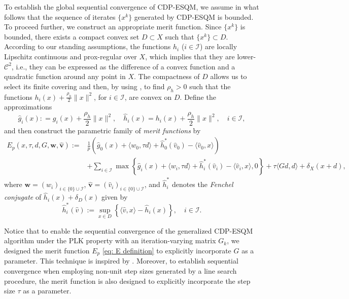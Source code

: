 \documentclass[11pt,a4paper]{article}
\def\hat{\widehat}\def\Hat{\widehat}
\theoremstyle{plain}
\begin{document}
To establish the global sequential convergence of CDP-ESQM, we assume in what follows that the sequence of iterates \( \{x^k\} \) generated by CDP-ESQM is bounded. To proceed further, we construct an appropriate merit function. Since $ \{x^k\} $ is bounded, there exists a compact convex set $D \subset X$ such that $\{x^k\} \subset D$. According to our standing assumptions, {the functions $h_i$ ($i \in \mathcal I$)} are locally Lipschitz continuous and prox-regular over $X$, which implies that {they} are lower-$\mathcal{C}^2$, i.e., they can be expressed as the difference of a convex function and a quadratic function around any point in $X$. The compactness of $D$ allows us to select its finite covering and then, by using \cite[{Theorem~7.102}]{mordukhovich2022convex}, to find $\rho_h > 0$ such that the functions $h_i(x) + \frac{\rho_h}{2}\|x\|^2$, for {$i \in \mathcal I$}, are convex on $D$. Define the approximations
\[
\hat g_i(x): = g_i(x) + \frac{\rho_h}{2}\|x\|^2, \quad \hat{h}_i(x) = h_i(x) + \frac{\rho_h}{2}\|x\|^2, \quad {i \in \mathcal I,}
\]
and then construct the parametric family of {\em merit functions} by
\begin{equation}\label{eq: E definition}  
{
\begin{aligned}
E_{p}(x,\tau,d,G,\mathbf{w},\mathbf{\hat{v}}):=&\frac{1}{p}\left(\hat g_0(x)+\langle w_0,\tau d\rangle+\hat{h}_0^*(\hat v_0)-\langle \hat{v}_0,x\rangle\right)\\
&+\sum_{i\in\mathcal I} \max\left\{\hat g_i(x)+\langle w_i, \tau d\rangle+\hat{h}_i^*(\hat v_i)-\langle \hat{v}_i,x\rangle,0\right\}+\tau\langle Gd,d \rangle+\delta_X(x+d),
\end{aligned}
}
\end{equation}
where {$\mathbf{w} = (w_i)_{i\in\{0\}\cup\mathcal I}$, $\mathbf{\hat{v}} = (\hat{v}_i)_{i\in\{0\}\cup\mathcal I}$}, and $\hat{h}_i^*$ denotes the {\em Fenchel conjugate} of $\hat{h}_i(x) + \delta_D(x)$ given by 
$$
\hat{h}_i^*(\hat v):=\sup_{x \in D} \left\{\langle \hat v,x\rangle-\hat{h}_i(x)\right\}, \quad i \in \mathcal I.
$$

{
Notice that to enable the sequential convergence of the generalized CDP-ESQM algorithm under the PLK property with an iteration-varying matrix $G_k$, we designed the merit function $E_{p}$ \eqref{eq: E definition}
to explicitly incorporate $G$ as a parameter. This technique is inspired by \cite{panshaohua2024proximalnewton}. Moreover, to establish sequential convergence when employing non-unit step sizes generated by a line search procedure, the merit function is also designed to explicitly incorporate the step size $\tau$ as a parameter.
}
\end{document}
